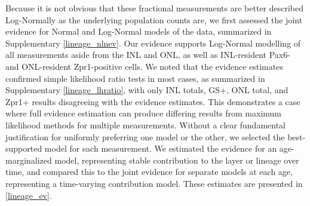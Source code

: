 Because it is not obvious that these fractional measurements are better described Log-Normally as the underlying population counts are, we first assessed the joint evidence for Normal and Log-Normal models of the data, summarized in Supplementary \autoref{lineage_nlnev}. Our evidence supports Log-Normal modelling of all measurements aside from the INL and ONL, as well as INL-resident Pax6- and ONL-resident Zpr1-positive cells. We noted that the evidence estimates confirmed simple likelihood ratio tests in most cases, as summarized in Supplementary \autoref{lineage_lhratio}, with only INL totals, GS+, ONL total, and Zpr1+ results disagreeing with the evidence estimates. This demonstrates a case where full evidence estimation can produce differing results from maximum likelihood methods for multiple measurements.  Without a clear fundamental justification for uniformly preferring one model or the other, we selected the best-supported model for each measurement. We estimated the evidence for an age-marginalized model, representing stable contribution to the layer or lineage over time, and compared this to the joint evidence for separate models at each age, representing a time-varying contribution model. These estimates are presented in \autoref{lineage_ev}.

